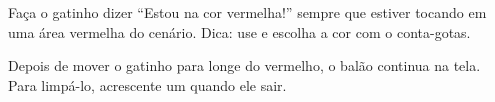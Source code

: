 \begin{desafio}
Faça o gatinho dizer ``Estou na cor vermelha!'' sempre que estiver tocando em uma área vermelha do cenário. Dica: use  e escolha a cor com o conta-gotas.
\end{desafio}

\begin{solucao}
\begin{pilha}
\sbcend
\sbcend
\end{pilha}
Depois de mover o gatinho para longe do vermelho, o balão continua na tela. Para limpá-lo, acrescente um  quando ele sair.
\end{solucao}
